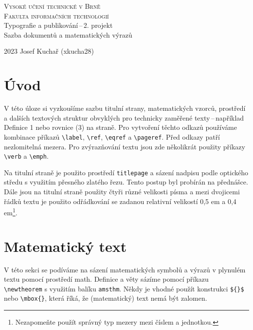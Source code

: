 \documentclass[twocolumn,11pt]{article}
\theoremstyle{definition}
\theoremstyle{plain}
\begin{document}
\begin{titlepage}
\begin{center}
\textsc{\Huge Vysoké učení technické v Brně\\\vspace{0.5em}\huge Fakulta informačních technologií}\\
\LARGE
Typografie a publikování\,--\,2. projekt\\
Sazba dokumentů a matematických výrazů
\end{center}
{\Large 2023 \hfill Josef Kuchař (xkucha28)}
\end{titlepage}
\clearpage

\section*{Úvod}
V této úloze si vyzkoušíme sazbu titulní strany, matematických vzorců,
prostředí a dalších textových struktur obvyklých pro technicky zaměřené
texty\,--\,například Definice 1 nebo rovnice (3) na straně. Pro vytvoření těchto
odkazů používáme kombinace příkazů \verb|\label|, \verb|\ref|, \verb|\eqref| a \verb|\pageref|.
Před odkazy patří nezlomitelná mezera. Pro zvýrazňování textu jsou zde
několikrát použity příkazy \verb|\verb| a \verb|\emph|.

Na titulní straně je použito
prostředí \verb|titlepage| a sázení nadpisu podle optického středu s využitím
přesného zlatého řezu. Tento postup byl probírán na přednášce. Dále jsou
na titulní straně použity čtyři různé velikosti písma a mezi dvojicemi
řádků textu je použito odřádkování se zadanou relativní velikostí 0,5 em
a 0,4 em\footnote{Nezapomeňte použít správný typ mezery mezi číslem a jednotkou.}.

\section{Matematický text}
V této sekci se podíváme na sázení matematických symbolů a výrazů v plynulém
textu pomocí prostředí math. Definice a věty sázíme pomocí příkazu \verb|\newtheorem|
s využitím balíku \verb|amsthm|. Někdy je vhodné použít konstrukci \verb|${}$| nebo \verb|\mbox{}|,
která říká, že (matematický) text nemá být zalomen.
\end{document}
